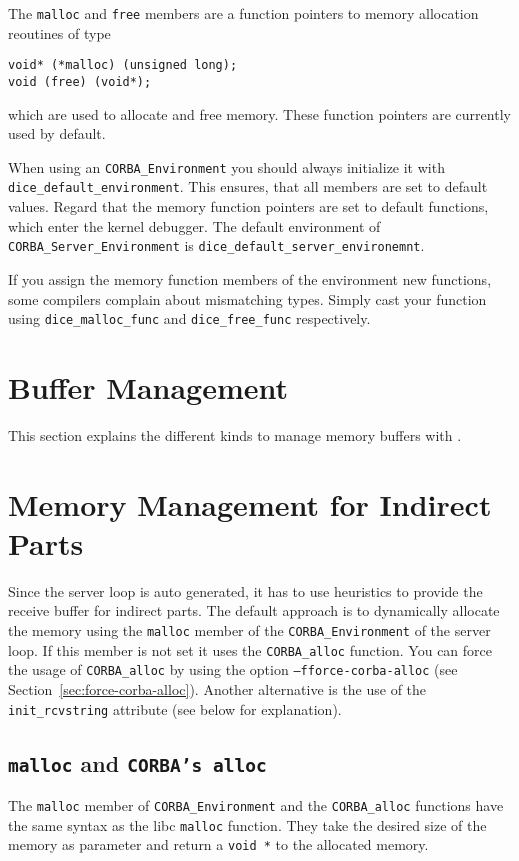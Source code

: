 The \verb|malloc| and \verb|free| members are a function pointers
to memory allocation reoutines of type
\begin{verbatim}
void* (*malloc) (unsigned long);
void (free) (void*);
\end{verbatim}
which are used to allocate and free memory. These function pointers
are currently used by default.

When using an \verb|CORBA_Environment| you should always
initialize it with \verb|dice_default_environment|. This
ensures, that all members are set to default values.
Regard that the memory function pointers are set to
default functions, which enter the kernel debugger.
The default environment of \verb|CORBA_Server_Environment| is
\verb|dice_default_server_environemnt|.

If you assign the memory function members of the environment new functions,
some compilers complain about mismatching types.  Simply cast your function
using \verb|dice_malloc_func| and \verb|dice_free_func| respectively.

\section{Buffer Management}

This section explains the different kinds to manage memory buffers with 
\dice{}.

\section{Memory Management for Indirect Parts}
\label{sec:mem-indirect-parts}
Since the server loop is auto generated, it has to use heuristics
to provide the receive buffer for indirect parts. The default
approach is to dynamically allocate the memory using the
\verb|malloc| member of the \verb|CORBA_Environment| of the server
loop. If this member is not set it uses the \verb|CORBA_alloc| 
function. You can force the usage of \verb|CORBA_alloc| by using
the option {\tt --fforce-corba-alloc} (see Section~\ref{sec:force-corba-alloc}). 
Another alternative is the use of the \verb|init_rcvstring| 
attribute (see below for explanation).

\subsection{{\tt malloc} and {\tt CORBA's alloc}}

The \verb|malloc| member of \verb|CORBA_Environment| and 
the \verb|CORBA_alloc| functions have the same
syntax as the libc \verb|malloc| function. They take the desired
size of the memory as parameter and return a \verb|void *| to the
allocated memory.

